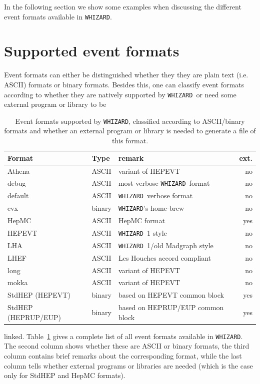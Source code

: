 \documentclass[12pt]{book}
\newcommand{\whizard}{\texttt{WHIZARD}}
\begin{document}
In the following section we show some examples when discussing the
different event formats available in \whizard.


\section{Supported event formats}
\label{sec:eventformats}

Event formats can either be distinguished whether they they are plain
text (i.e. ASCII) formats or binary formats. Besides this, one can
classify event formats according to whether they are natively
supported by \whizard\ or need some external program or library to be
\begin{table}
  \begin{center}
    \begin{tabular}{|l||l|l|r|}\hline
      Format & Type & remark & ext. \\\hline
      Athena & ASCII & variant of HEPEVT & no
      \\
      debug & ASCII & most verbose \whizard\ format & no
      \\
      default & ASCII & \whizard\ verbose format & no
      \\
      evx   & binary & \whizard's home-brew & no
      \\
      HepMC & ASCII & HepMC format & yes 
      \\
      HEPEVT & ASCII & \whizard~1 style & no
      \\
      LHA  & ASCII & \whizard~1/old Madgraph style &no 
      \\
      LHEF & ASCII & Les Houches accord compliant & no
      \\
      long & ASCII & variant of HEPEVT & no 
      \\
      mokka & ASCII & variant of HEPEVT & no
      \\
      StdHEP (HEPEVT) & binary & based on HEPEVT common block  & yes
      \\
      StdHEP (HEPRUP/EUP) & binary & based on HEPRUP/EUP common block
      & yes \\
      \hline
    \end{tabular}    
  \end{center}
  \caption{\label{tab:eventformats}
    Event formats supported by \whizard, classified according to
    ASCII/binary formats and whether an external program or library is
    needed to generate a file of this format. 
  }
\end{table}
linked. Table~\ref{tab:eventformats} gives a complete list of all
event formats available in \whizard. The second column shows whether
these are ASCII or binary formats, the third column contains brief
remarks about the corresponding format, while the last column tells
whether external programs or libraries are needed (which is the case
only for StdHEP and HepMC formats). 
\end{document}
